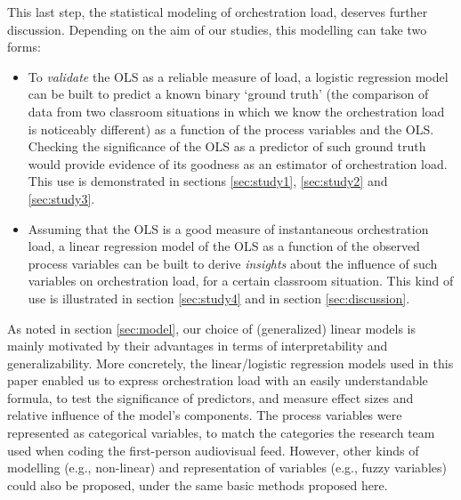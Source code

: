 \documentclass[10pt,journal,compsoc]{IEEEtran}
\begin{document}
This last step, the statistical modeling of orchestration load, deserves further discussion. Depending on the aim of our studies, this modelling can take two forms:

\begin{itemize}
\item To \textit{validate} the OLS as a reliable measure of load, a logistic regression model can be built to predict a known binary `ground truth' (the comparison of data from two classroom situations in which we know the orchestration load is noticeably different) as a function of the process variables and the OLS. Checking the significance of the OLS as a predictor of such ground truth would provide evidence of its goodness as an estimator of orchestration load. This use is demonstrated in sections \ref{sec:study1}, \ref{sec:study2} and \ref{sec:study3}.
\item Assuming that the OLS is a good measure of instantaneous orchestration load, a linear regression model of the OLS as a function of the observed process variables can be built to derive \textit{insights} about the influence of such variables on orchestration load, for a certain classroom situation. This kind of use is illustrated in section \ref{sec:study4} and in section \ref{sec:discussion}.
\end{itemize}

As noted in section \ref{sec:model}, our choice of (generalized) linear models is mainly motivated by their advantages in terms of interpretability and generalizability. More concretely, the linear/logistic regression models used in this paper enabled us to express orchestration load with an easily understandable formula, to test the significance of predictors, and measure effect sizes and relative influence of the model's components. The process variables were represented as categorical variables, to match the categories the research team used when coding the first-person audiovisual feed. However, other kinds of modelling (e.g., non-linear) and representation of variables (e.g., fuzzy variables) could also be proposed, under the same basic methods proposed here.
\end{document}
